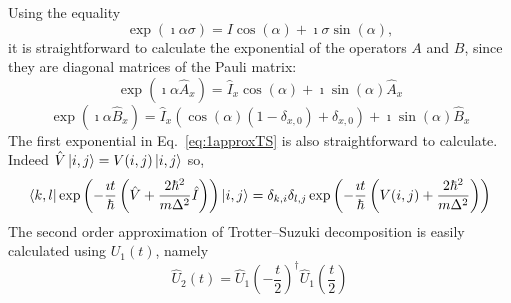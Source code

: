Using the equality 
\begin{equation}
\exp(\imath \alpha \sigma) = I \cos(\alpha) + \imath \sigma \sin(\alpha),
\end{equation}
it is straightforward to calculate the exponential of the operators $A$ and $B$, since they are diagonal matrices of the Pauli matrix:
\begin{equation} \label{eq:expA}
\exp\left(\imath \alpha \hat{A}_x \right) = \hat{I}_x \cos(\alpha) + \imath \sin(\alpha) \hat{A}_x
\end{equation}
\begin{equation} \label{eq:expB}
\exp\left(\imath \alpha \hat{B}_x \right) = \hat{I}_x (\cos(\alpha)(1-\delta_{x,0}) + \delta_{x,0}) + \imath \sin(\alpha) \hat{B}_x
\end{equation}
The first exponential in Eq.~\eqref{eq:1approxTS} is also straightforward to calculate. Indeed $\hat{V} \ket{i,j} = V(i,j) \ket{i,j}$ so,
\begin{equation}
\bra{k,l} \exp\left(-\frac{\imath t}{\hbar}\left(\hat{V} + \frac{2 \hbar^2}{m \Delta^2} \hat{I}\right) \right) \ket{i,j} = \delta_{k,i} \delta_{l,j} \exp\left( -\frac{\imath t}{\hbar} \left( V(i,j) + \frac{2 \hbar^2}{m \Delta^2} \right) \right)
\end{equation}
The second order approximation of Trotter--Suzuki decomposition is easily calculated using $U_1(t)$, namely
\begin{equation} \label{eq:second-TS-evo-operator}
\hat{U}_2(t) = \hat{U}_1\left( -\frac{t}{2} \right)^\dagger \hat{U}_1\left(\frac{t}{2}\right)
\end{equation}

